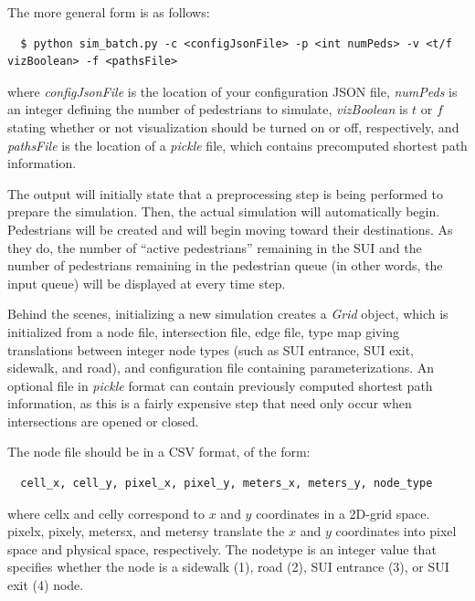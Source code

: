 \documentclass[12pt]{article}
\begin{document}
The more general form is as follows:
\\
\begin{lstlisting}
  $ python sim_batch.py -c <configJsonFile> -p <int numPeds> -v <t/f vizBoolean> -f <pathsFile>
\end{lstlisting}

where \textit{configJsonFile} is the location of your configuration JSON file, \textit{numPeds} is
an integer defining the number of pedestrians to simulate, \textit{vizBoolean} is $t$
or $f$ stating whether or not visualization should be turned on or off,
respectively, and \textit{pathsFile} is the location of a \textit{pickle} file, which
contains precomputed shortest path information.

The output will initially state that a preprocessing step is being performed
to prepare the simulation. Then, the actual simulation will automatically begin.
Pedestrians will be created and will begin moving toward their destinations. As
they do, the number of ``active pedestrians'' remaining in the SUI and the
number of pedestrians remaining in the pedestrian queue (in other words, the
input queue) will be displayed at every time step.

Behind the scenes, initializing a new simulation creates a
\textit{Grid} object, which is initialized from a node file, intersection file, edge file,
type map giving translations between integer node types (such as SUI entrance,
SUI exit, sidewalk, and road), and configuration file containing
parameterizations. An optional file in \textit{pickle} format can
contain previously computed shortest path information, as this is a fairly
expensive step that need only occur when intersections are opened or closed.

The node file should be in a CSV format, of the form:

\begin{lstlisting}
  cell_x, cell_y, pixel_x, pixel_y, meters_x, meters_y, node_type
\end{lstlisting}

where cell\textunderscore x and cell\textunderscore y correspond to $x$ and $y$
coordinates in a 2D-grid space. pixel\textunderscore x, pixel\textunderscore y,
meters\textunderscore x, and meters\textunderscore y translate the $x$ and $y$
coordinates into pixel space and physical space, respectively. The
node\textunderscore type is an integer value that specifies whether the node
is a sidewalk (1), road (2), SUI entrance (3), or SUI exit (4) node.
\end{document}
